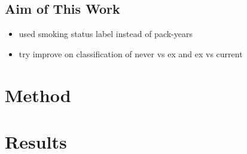 \documentclass{article}
\begin{document}
\subsection{Aim of This Work}
\begin{itemize}
    \item used smoking status label instead of pack-years
    \item try improve on classification of never vs ex and ex vs current
\end{itemize}

\section{Method}

\section{Results}

\printbibliography
\end{document}
